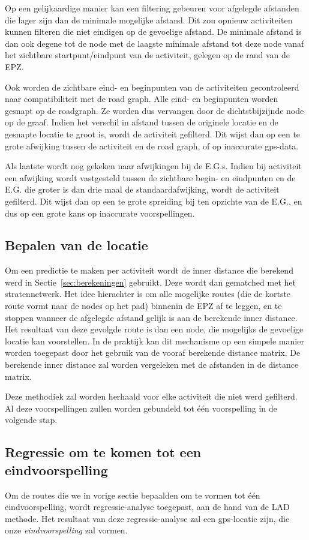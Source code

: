 Op een gelijkaardige manier kan een filtering gebeuren voor afgelegde afstanden
die lager zijn dan de minimale mogelijke afstand. Dit zou opnieuw activiteiten
kunnen filteren die niet eindigen op de gevoelige afstand. De minimale afstand
is dan ook degene tot de node met de laagste minimale afstand tot deze node
vanaf het zichtbare startpunt/eindpunt van de activiteit, gelegen op de rand
van de \ac{EPZ}.

Ook worden de zichtbare eind- en beginpunten van de activiteiten gecontroleerd
naar compatibiliteit met de road graph. Alle eind- en beginpunten worden
gesnapt op de roadgraph. Ze worden dus vervangen door de dichtstbijzijnde node
op de graaf. Indien het verschil in afstand tussen de originele locatie en de
gesnapte locatie te groot is, wordt de activiteit gefilterd. Dit wijst dan op
een te grote afwijking tussen de activiteit en de road graph, of op inaccurate
gps-data.

Als laatste wordt nog gekeken naar afwijkingen bij de \acp{E.G.}. Indien bij
activiteit een afwijking wordt vastgesteld tussen de zichtbare begin- en
eindpunten en de \ac{E.G.} die groter is dan drie maal de standaardafwijking,
wordt de activiteit gefilterd. Dit wijst dan op een te grote spreiding bij ten
opzichte van de \ac{E.G.}, en dus op een grote kans op inaccurate
voorspellingen.

\subsection{Bepalen van de locatie}
Om een predictie te maken per activiteit wordt de inner distance die berekend
werd in Sectie~\ref{sec:berekeningen} gebruikt. Deze wordt dan gematched met
het stratennetwerk. Het idee hierachter is om alle mogelijke routes (die de
kortste route vormt naar de nodes op het pad) binnenin de \ac{EPZ} af te
leggen, en te stoppen wanneer de afgelegde afstand gelijk is aan de berekende
inner distance. Het resultaat van deze gevolgde route is dan een node, die
mogelijks de gevoelige locatie kan voorstellen. In de praktijk kan dit
mechanisme op een simpele manier worden toegepast door het gebruik van de
vooraf berekende distance matrix. De berekende inner distance zal worden
vergeleken met de afstanden in de distance matrix.

Deze methodiek zal worden herhaald voor elke activiteit die niet werd
gefilterd. Al deze voorspellingen zullen worden gebundeld tot één voorspelling
in de volgende stap.

\subsection{Regressie om te komen tot een eindvoorspelling}
Om de routes die we in vorige sectie bepaalden om te vormen tot één
eindvoorspelling, wordt regressie-analyse toegepast, aan de hand van de
\ac{LAD} methode. Het resultaat van deze regressie-analyse zal een
\ac{gps}-locatie zijn, die onze \textit{eindvoorspelling} zal vormen.

